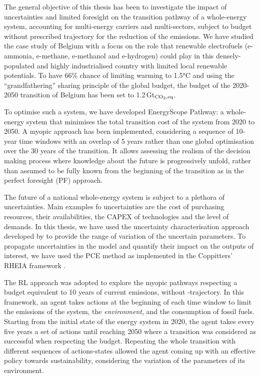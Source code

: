 

The general objective of this thesis has been to investigate the impact of uncertainties and limited foresight on the transition pathway of a whole-energy system, accounting for multi-energy carriers and multi-sectors, subject to  budget without prescribed trajectory for the reduction of the emissions.  We have studied the case study of Belgium with a focus on the role that renewable electrofuels (e-ammonia, e-methane, e-methanol and e-hydrogen) could play in this densely-populated and highly industrialised country with limited local renewable potentials. To have 66\% chance of limiting warming to 1.5°C and using the ``grandfathering'' sharing principle of the global budget, the  budget of the 2020-2050 transition of Belgium has been set to 1.2\,Gt$_{\ce{CO2},\text{eq}}$.

To optimise such a system, we have developed EnergyScope Pathway: a whole-energy system that minimises the total transition cost of the system from 2020 to 2050. A myopic approach has been implemented, considering a sequence of 10-year time windows with an overlap of 5 years rather than one global optimisation over the 30 years of the transition. It allows assessing the realism of the decision making process where knowledge about the future is progressively unfold, rather than assumed to be fully known from the beginning of the transition as in the perfect foresight (PF) approach. 

The future of a national whole-energy system is subject to a plethora of uncertainties. Main examples fo uncertainties are the cost of purchasing resources, their availabilities, the \acrfull{CAPEX} of technologies and the level of demands. In this thesis, we have used the uncertainty characterisation approach developed by \citet{moret2016strategic} to provide the range of variation of the uncertain parameters. To propagate uncertainties in the model and quantify their impact on the outputs of interest, we have used the \acrfull{PCE} method as implemented in the Coppitters' RHEIA framework \cite{coppittersthesis}.

The \acrfull{RL} approach was adopted to explore the myopic pathways respecting a  budget equivalent to 10 years of current emissions, without -trajectory. In this framework, an agent takes actions at the beginning of each time window to limit the emissions of the system, the \textit{environment}, and the consumption of fossil fuels. Starting from the initial state of the energy system in 2020, the agent takes every five years a set of actions until reaching 2050 where a transition was considered as successful when respecting the  budget. Repeating the whole transition with different sequences of actions-states allowed the agent coming up with an effective policy towards sustainability, considering the variation of the parameters of its environment.


